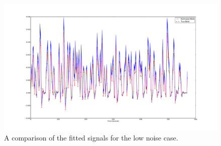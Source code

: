 \begin{figure}
\includegraphics[clip=true,trim=6cm 2cm 6cm 3.5cm,width=17cm]{images/comparison_lownoise}
\caption{A comparison of the fitted signals for the low noise case.}
\label{fig:FitComparisonLowNoise}
\end{figure}

